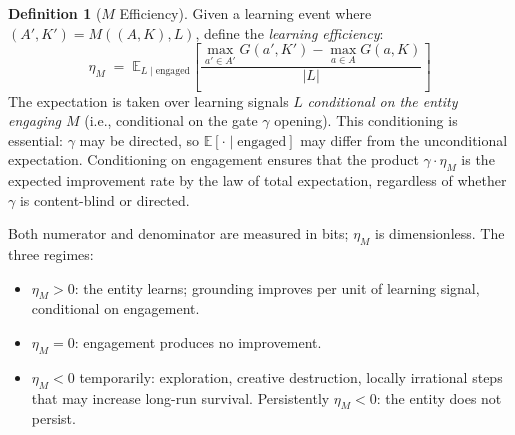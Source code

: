 \documentclass[11pt]{article}
\theoremstyle{definition}
\newtheorem{definition}{Definition}
\theoremstyle{remark}
\begin{document}
\begin{definition}[$M$ Efficiency]
\label{def:eta}
Given a learning event where $(A', K') = M((A, K), L)$, define the
\emph{learning efficiency}:
\[
\eta_M \;=\; \mathbb{E}_{L \mid \text{engaged}}\!\left[
\frac{\max_{a' \in A'} G(a', K') - \max_{a \in A} G(a, K)}{|L|}
\right]
\]
The expectation is taken over learning signals $L$ \emph{conditional on
the entity engaging $M$} (i.e., conditional on the gate $\gamma$
opening). This conditioning is essential: $\gamma$ may be directed,
so $\mathbb{E}[{\cdot} \mid \text{engaged}]$ may differ from the
unconditional expectation. Conditioning on engagement ensures that the
product $\gamma \cdot \eta_M$ is the expected improvement rate by the
law of total expectation, regardless of whether $\gamma$ is
content-blind or directed.

Both numerator and denominator are measured in bits; $\eta_M$ is
dimensionless. The three regimes:
\begin{itemize}
\item $\eta_M > 0$: the entity learns; grounding improves per unit
      of learning signal, conditional on engagement.
\item $\eta_M = 0$: engagement produces no improvement.
\item $\eta_M < 0$ temporarily: exploration, creative destruction,
      locally irrational steps that may increase long-run survival.
      Persistently $\eta_M < 0$: the entity does not persist.
\end{itemize}
\end{definition}
\end{document}
